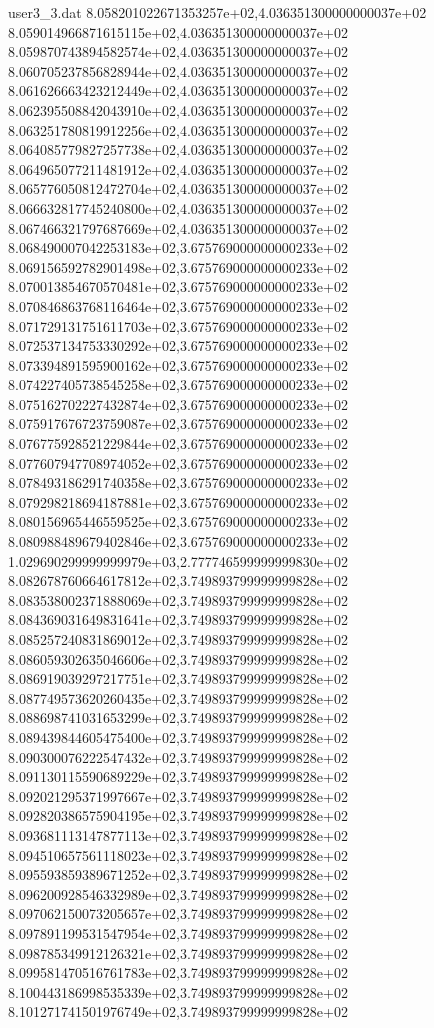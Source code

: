 \begin{filecontents}{user3_3.dat}
8.058201022671353257e+02,4.036351300000000037e+02
8.059014966871615115e+02,4.036351300000000037e+02
8.059870743894582574e+02,4.036351300000000037e+02
8.060705237856828944e+02,4.036351300000000037e+02
8.061626663423212449e+02,4.036351300000000037e+02
8.062395508842043910e+02,4.036351300000000037e+02
8.063251780819912256e+02,4.036351300000000037e+02
8.064085779827257738e+02,4.036351300000000037e+02
8.064965077211481912e+02,4.036351300000000037e+02
8.065776050812472704e+02,4.036351300000000037e+02
8.066632817745240800e+02,4.036351300000000037e+02
8.067466321797687669e+02,4.036351300000000037e+02
8.068490007042253183e+02,3.675769000000000233e+02
8.069156592782901498e+02,3.675769000000000233e+02
8.070013854670570481e+02,3.675769000000000233e+02
8.070846863768116464e+02,3.675769000000000233e+02
8.071729131751611703e+02,3.675769000000000233e+02
8.072537134753330292e+02,3.675769000000000233e+02
8.073394891595900162e+02,3.675769000000000233e+02
8.074227405738545258e+02,3.675769000000000233e+02
8.075162702227432874e+02,3.675769000000000233e+02
8.075917676723759087e+02,3.675769000000000233e+02
8.076775928521229844e+02,3.675769000000000233e+02
8.077607947708974052e+02,3.675769000000000233e+02
8.078493186291740358e+02,3.675769000000000233e+02
8.079298218694187881e+02,3.675769000000000233e+02
8.080156965446559525e+02,3.675769000000000233e+02
8.080988489679402846e+02,3.675769000000000233e+02
1.029690299999999979e+03,2.777746599999999830e+02
8.082678760664617812e+02,3.749893799999999828e+02
8.083538002371888069e+02,3.749893799999999828e+02
8.084369031649831641e+02,3.749893799999999828e+02
8.085257240831869012e+02,3.749893799999999828e+02
8.086059302635046606e+02,3.749893799999999828e+02
8.086919039297217751e+02,3.749893799999999828e+02
8.087749573620260435e+02,3.749893799999999828e+02
8.088698741031653299e+02,3.749893799999999828e+02
8.089439844605475400e+02,3.749893799999999828e+02
8.090300076222547432e+02,3.749893799999999828e+02
8.091130115590689229e+02,3.749893799999999828e+02
8.092021295371997667e+02,3.749893799999999828e+02
8.092820386575904195e+02,3.749893799999999828e+02
8.093681113147877113e+02,3.749893799999999828e+02
8.094510657561118023e+02,3.749893799999999828e+02
8.095593859389671252e+02,3.749893799999999828e+02
8.096200928546332989e+02,3.749893799999999828e+02
8.097062150073205657e+02,3.749893799999999828e+02
8.097891199531547954e+02,3.749893799999999828e+02
8.098785349912126321e+02,3.749893799999999828e+02
8.099581470516761783e+02,3.749893799999999828e+02
8.100443186998535339e+02,3.749893799999999828e+02
8.101271741501976749e+02,3.749893799999999828e+02

\end{filecontents}
